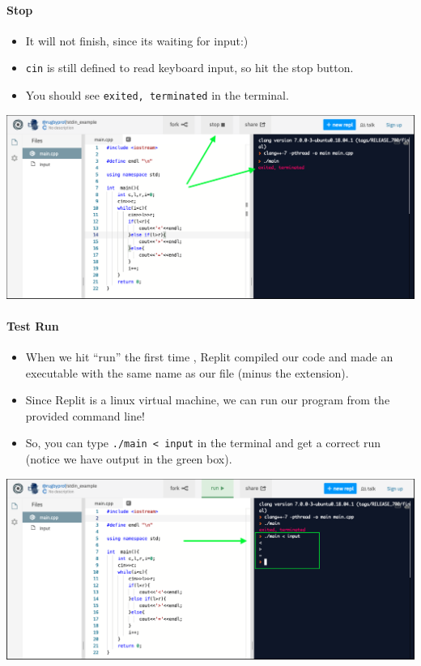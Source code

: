\hypertarget{stop}{%
\paragraph{Stop}\label{stop}}

\begin{itemize}
\tightlist
\item
  It will not finish, since its waiting for input:)
\item
  \texttt{cin} is still defined to read keyboard input, so hit the stop
  button.
\item
  You should see \texttt{exited,\ terminated} in the terminal.
\end{itemize}

\begin{center}
\includegraphics[scale=.4]{images/replit_stdin_2.png}
\end{center}

\hypertarget{test-run}{%
\paragraph{Test Run}\label{test-run}}

\begin{itemize}
\tightlist
\item
  When we hit ``run'' the first time , Replit compiled our code and made
  an executable with the same name as our file (minus the extension).
\item
  Since Replit is a linux virtual machine, we can run our program from
  the provided command line!
\item
  So, you can type \texttt{./main\ \textless{}\ input} in the terminal
  and get a correct run (notice we have output in the green box).
\end{itemize}

\begin{center}
\includegraphics[scale=.4]{images/replit_stdin_3.png}
\end{center}

